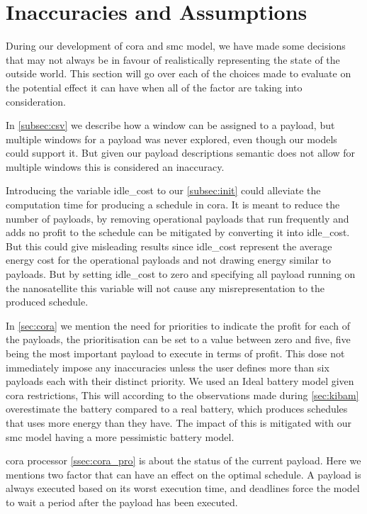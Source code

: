 \section{Inaccuracies and Assumptions}\label{sec:in_and_ass}
During our development of \gls{cora} and \gls{smc} model, we have made some decisions that may not always be in favour of realistically representing the state of the outside world. This section will go over each of the choices made to evaluate on the potential effect it can have when all of the factor are taking into consideration.

In  \cref{subsec:csv} we describe how a window can be assigned to a payload, but multiple windows for a payload was never explored, even though our models could support it. But given our payload descriptions semantic does not allow for multiple windows this is considered an inaccuracy.

Introducing the variable idle\_cost to our  \cref{subsec:init} could alleviate the computation time for producing a schedule in \gls{cora}. It is meant to reduce the number of payloads, by removing operational payloads that run frequently and adds no profit to the schedule can be mitigated by converting it into idle\_cost. But this could give misleading results since idle\_cost represent the average energy cost for the operational payloads and not drawing energy similar to payloads. But by setting idle\_cost to zero and specifying all payload running on the nanosatellite this variable will not cause any misrepresentation to the produced schedule.

In \cref{sec:cora} we mention the need for priorities to indicate the profit for each of the payloads, the prioritisation can be set to a value between zero and five, five being the most important payload to execute in terms of profit. This dose not immediately impose any inaccuracies unless the user defines more than six payloads each with their distinct priority.
We used an Ideal battery model given \gls{cora} restrictions, This will according to the observations made during \cref{sec:kibam} overestimate the battery compared to a real battery, which produces schedules that uses more energy than they have. The impact of this is mitigated with our \gls{smc} model having a more pessimistic battery model.

\gls{cora} processor \cref{ssec:cora_pro} is about the status of the current payload. Here we mentions two factor that can have an effect on the optimal schedule. A payload is always executed based on its worst execution time, and deadlines force the model to wait a period after the payload has been executed. 

